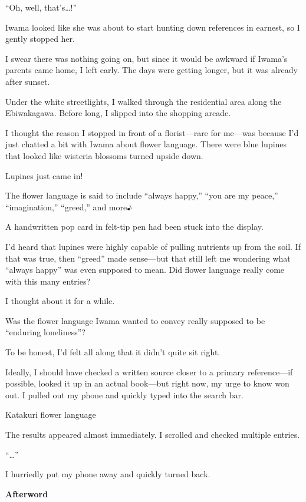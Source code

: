 \documentclass[
    a4paper,
    12pt,
    twoside,
    openany,
    UTF8,
    fontset=windows
]{ctexbook}
\begin{document}
``Oh, well, that's\dots!''

Iwama looked like she was about to start hunting down references in earnest, so I gently stopped her.

I swear there was nothing going on, but since it would be awkward if Iwama's parents came home, I left early. The days were getting longer, but it was already after sunset.

Under the white streetlights, I walked through the residential area along the Ebiwakagawa. Before long, I slipped into the shopping arcade.

I thought the reason I stopped in front of a florist---rare for me---was because I'd just chatted a bit with Iwama about flower language. There were blue lupines that looked like wisteria blossoms turned upside down.
{\bfseries

Lupines just came in!

The flower language is said to include ``always happy,'' ``you are my peace,'' ``imagination,'' ``greed,'' and more♪

}

A handwritten pop card in felt-tip pen had been stuck into the display.

I'd heard that lupines were highly capable of pulling nutrients up from the soil. If that was true, then ``greed'' made sense---but that still left me wondering what ``always happy'' was even supposed to mean. Did flower language really come with this many entries?

I thought about it for a while.

Was the flower language Iwama wanted to convey really supposed to be ``enduring loneliness''?

To be honest, I'd felt all along that it didn't quite sit right.

Ideally, I should have checked a written source closer to a primary reference---if possible, looked it up in an actual book---but right now, my urge to know won out. I pulled out my phone and quickly typed into the search bar.

Katakuri flower language

The results appeared almost immediately. I scrolled and checked multiple entries.

``\dots''

I hurriedly put my phone away and quickly turned back.

\clearpage
\thispagestyle{plain}
\begin{center}
    \large\bfseries
    Afterword
\end{center}
\label{sec:afterword}
\vspace{1cm}
\end{document}
